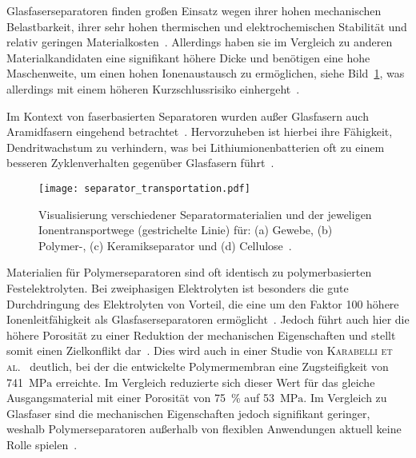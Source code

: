 

Glasfaserseparatoren finden großen Einsatz wegen ihrer hohen mechanischen Belastbarkeit, ihrer sehr hohen thermischen und elektrochemischen Stabilität und relativ geringen Materialkosten~\cite{Luo2015,Asp2019,Asp2021,Liu2022}. Allerdings haben sie im Vergleich zu anderen Materialkandidaten eine signifikant höhere Dicke und benötigen eine hohe Maschenweite, um einen hohen Ionenaustausch zu ermöglichen, siehe Bild~\ref{fig:separator_transportation}, was allerdings mit einem höheren Kurzschlussrisiko einhergeht~\cite{Danzi2021,Zhou2022}. 

Im Kontext von faserbasierten Separatoren wurden außer Glasfasern auch Aramidfasern eingehend betrachtet~\cite{Jin2023}. Hervorzuheben ist hierbei ihre Fähigkeit, Dendritwachstum zu verhindern, was bei Lithiumionenbatterien oft zu einem besseren Zyklenverhalten gegenüber Glasfasern führt~\cite{Tung2015,Wang2021a}.

\begin{figure}[ht]
        \center
	\texttt{[image: separator\_transportation.pdf]}
		\caption{\label{fig:separator_transportation}Visualisierung verschiedener Separatormaterialien und der jeweligen Ionentransportwege (gestrichelte Linie) für: (a) Gewebe, (b) Polymer-, (c) Keramikseparator und (d) Cellulose~\cite{Zschiebsch2024}.}
\end{figure}


Materialien für Polymerseparatoren sind oft identisch zu polymerbasierten Festelektrolyten. Bei zweiphasigen Elektrolyten ist besonders die gute Durchdringung des Elektrolyten von Vorteil, die eine um den Faktor 100 höhere Ionenleitfähigkeit als Glasfaserseparatoren ermöglicht~\cite{Wang2021a}. Jedoch führt auch hier die höhere Porosität zu einer Reduktion der mechanischen Eigenschaften und stellt somit einen Zielkonflikt dar~\cite{Ahankari2022}. Dies wird auch in einer Studie von \textsc{Karabelli et al.}~\cite{Karabelli2011} deutlich, bei der die entwickelte Polymermembran eine Zugsteifigkeit von 741~$\si{\MPa}$ erreichte. Im Vergleich reduzierte sich dieser Wert für das gleiche Ausgangsmaterial mit einer Porosität von 75~\% auf 53~$\si{\MPa}$. Im Vergleich zu Glasfaser sind die mechanischen Eigenschaften jedoch signifikant geringer, weshalb Polymerseparatoren außerhalb von flexiblen Anwendungen aktuell keine Rolle spielen~\cite{Zschiebsch2024}.

